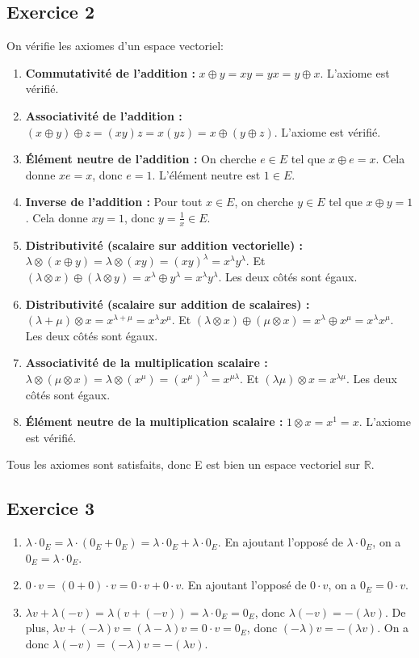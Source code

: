 \documentclass[french]{yLectureNote}
\begin{document}
\subsection{Exercice 2}
On vérifie les axiomes d'un espace vectoriel:
\begin{enumerate}
    \item \textbf{Commutativité de l'addition :} $x\oplus y = xy = yx = y\oplus x$. L'axiome est vérifié.
    \item \textbf{Associativité de l'addition :} $(x\oplus y)\oplus z = (xy)z = x(yz) = x\oplus (y\oplus z)$. L'axiome est vérifié.
    \item \textbf{Élément neutre de l'addition :} On cherche $e \in E$ tel que $x\oplus e = x$. Cela donne $xe=x$, donc $e=1$. L'élément neutre est $1 \in E$.
    \item \textbf{Inverse de l'addition :} Pour tout $x \in E$, on cherche $y \in E$ tel que $x\oplus y = 1$. Cela donne $xy=1$, donc $y=\frac{1}{x} \in E$.
    \item \textbf{Distributivité (scalaire sur addition vectorielle) :} $\lambda\otimes (x\oplus y) = \lambda\otimes (xy)=(xy)^\lambda=x^\lambda y^\lambda$. Et $(\lambda\otimes x)\oplus (\lambda\otimes y) = x^\lambda\oplus y^\lambda=x^\lambda y^\lambda$. Les deux côtés sont égaux.
    \item \textbf{Distributivité (scalaire sur addition de scalaires) :} $(\lambda+\mu)\otimes x = x^{\lambda+\mu}=x^\lambda x^\mu$. Et $(\lambda\otimes x)\oplus (\mu\otimes x) = x^\lambda\oplus x^\mu = x^\lambda x^\mu$. Les deux côtés sont égaux.
    \item \textbf{Associativité de la multiplication scalaire :} $\lambda\otimes (\mu\otimes x) = \lambda\otimes (x^\mu) = (x^\mu)^\lambda = x^{\mu\lambda}$. Et $(\lambda\mu)\otimes x = x^{\lambda\mu}$. Les deux côtés sont égaux.
    \item \textbf{Élément neutre de la multiplication scalaire :} $1\otimes x=x^1=x$. L'axiome est vérifié.
\end{enumerate}
Tous les axiomes sont satisfaits, donc E est bien un espace vectoriel sur $\mathbb{R}$.

\subsection{Exercice 3}
\begin{enumerate}
    \item $\lambda\cdot0_E = \lambda\cdot(0_E+0_E) = \lambda\cdot0_E + \lambda\cdot0_E$. En ajoutant l'opposé de $\lambda\cdot0_E$, on a $0_E = \lambda\cdot0_E$.
    \item $0\cdot v = (0+0)\cdot v = 0\cdot v + 0\cdot v$. En ajoutant l'opposé de $0\cdot v$, on a $0_E = 0\cdot v$.
    \item $\lambda v + \lambda(-v) = \lambda(v+(-v))=\lambda\cdot0_E=0_E$, donc $\lambda(-v)=-(\lambda v)$. De plus, $\lambda v+(-\lambda)v=(\lambda-\lambda)v=0\cdot v=0_E$, donc $(-\lambda)v=-(\lambda v)$. On a donc $\lambda(-v)=(-\lambda)v=-(\lambda v)$.
\end{enumerate}
\end{document}
